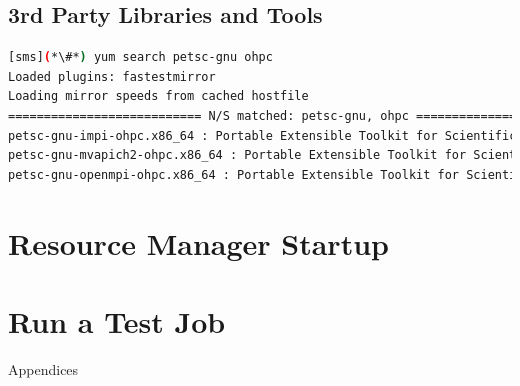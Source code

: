 \documentclass[letterpaper]{article}
\begin{document}
\subsection{3rd Party Libraries and Tools} \label{sec:3rdparty}



\begin{lstlisting}[language=bash,keywords={}]
[sms](*\#*) yum search petsc-gnu ohpc
Loaded plugins: fastestmirror
Loading mirror speeds from cached hostfile
=========================== N/S matched: petsc-gnu, ohpc ===========================
petsc-gnu-impi-ohpc.x86_64 : Portable Extensible Toolkit for Scientific Computation
petsc-gnu-mvapich2-ohpc.x86_64 : Portable Extensible Toolkit for Scientific Computation
petsc-gnu-openmpi-ohpc.x86_64 : Portable Extensible Toolkit for Scientific Computation
\end{lstlisting}



\vspace*{0.2cm}

\section{Resource Manager Startup} \label{sec:rms_startup}




\section{Run a Test Job} \label{sec:test_job}


\clearpage
\appendix
{\bf \LARGE \centerline{Appendices}} \vspace*{0.2cm}

\renewcommand{\thesubsection}{\Alph{subsection}}





\end{document}
